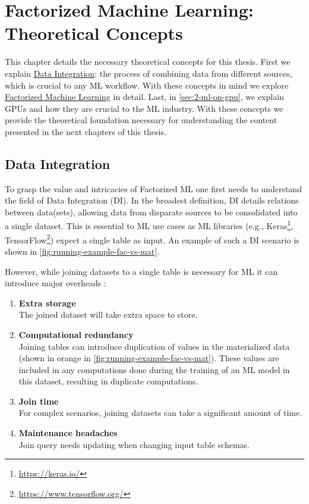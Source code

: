 
\chapter{Factorized Machine Learning: Theoretical Concepts}
\label{chapter:preliminary}

This chapter details the necessary theoretical concepts for this thesis. First we explain \hyperref[sec:2-data-integration]{Data Integration}: the process of combining data from different sources, which is crucial to any ML workflow. With these concepts in mind we explore \hyperref[sec:2-factorized-ml]{Factorized Machine Learning} in detail. Last, in \autoref{sec:2-ml-on-gpu}, we explain GPUs and how they are crucial to the ML industry. With these concepts we provide the theoretical foundation necessary for understanding the content presented in the next chapters of this thesis.


\section{Data Integration}
\label{sec:2-data-integration}
To grasp the value and intricacies of Factorized ML one first needs to understand the field of Data Integration (DI). In the broadest definition, DI details relations between data(sets), allowing data from disparate sources to be consolidated into a single dataset. This is essential to ML use cases as ML libraries (e.g., Keras\footnote{\url{https://keras.io/}}, TensorFlow\footnote{\url{https://www.tensorflow.org/}}) expect a single table as input. An example of such a DI scenario is shown in \autoref{fig:running-example-fac-vs-mat}.


However, while joining datasets to a single table is necessary for ML it can introduce major overheads \cite{data-management-in-ML-kumar-2017}:

\begin{enumerate}
    \item \textbf{Extra storage}\\ The joined dataset will take extra space to store.
    \item \textbf{Computational redundancy} \\ Joining tables can introduce duplication of values in the materialized data (shown in orange in \autoref{fig:running-example-fac-vs-mat}). These values are included in any computations done during the training of an ML model in this dataset, resulting in duplicate computations.
    \item \textbf{Join time} \\For complex scenarios, joining datasets can take a significant amount of time.
    \item \textbf{Maintenance headaches} \\Join query needs updating when changing input table schemas.
\end{enumerate}


